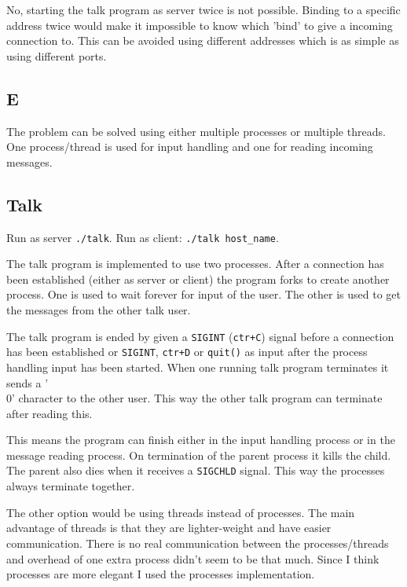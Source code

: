\documentclass[10pt,a4paper]{article}
\begin{document}
No, starting the talk program as server twice is not possible. Binding to a specific address twice would make it impossible to know which 'bind' to give a incoming connection to. This can be avoided using different addresses which is as simple as using different ports. 

\subsection{E}
The problem can be solved using either multiple processes or multiple threads. One process/thread is used for input handling and one for reading incoming messages.

\subsection{Talk}
Run as server \texttt{./talk}. Run as client: \texttt{./talk host\_name}. 

The talk program is implemented to use two processes. After a connection has been established (either as server or client) the program forks to create another process. One is used to wait forever for input of the user. The other is used to get the messages from the other talk user.

The talk program is ended by given a \texttt{SIGINT} (\texttt{ctr+C}) signal before a connection has been established or \texttt{SIGINT}, \texttt{ctr+D} or \texttt{quit()} as input after the process handling input has been started. When one running talk program terminates it sends a '\\0' character to the other user. This way the other talk program can terminate after reading this.

This means the program can finish either in the input handling process or in the message reading process. On termination of the parent process it kills the child. The parent also dies when it receives a \texttt{SIGCHLD} signal. This way the processes always terminate together. 

The other option would be using threads instead of processes. The main advantage of threads is that they are lighter-weight and have easier communication. There is no real communication between the processes/threads and overhead of one extra process didn't seem to be that much. Since I think processes are more elegant I used the processes implementation.
\end{document}
